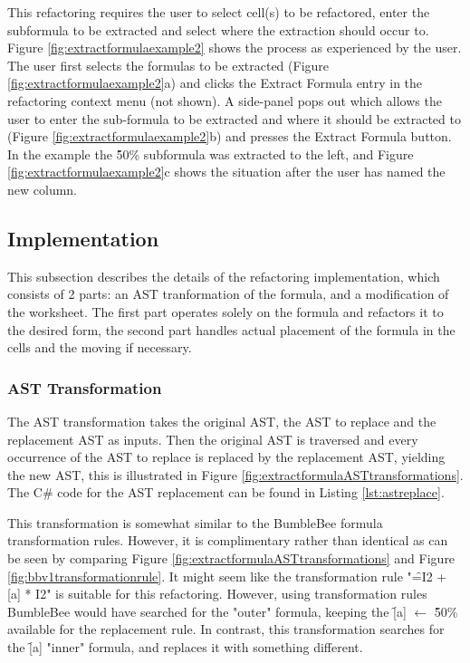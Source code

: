 This refactoring requires the user to select cell(s) to be refactored, enter the subformula to be extracted and select where the extraction should occur to.
Figure \ref{fig:extractformulaexample2} shows the process as experienced by the user.
The user first selects the formulas to be extracted (Figure \ref{fig:extractformulaexample2}a) and clicks the Extract Formula entry in the refactoring context menu (not shown).
A side-panel pops out which allows the user to enter the sub-formula to be extracted and where it should be extracted to (Figure \ref{fig:extractformulaexample2}b) and presses the Extract Formula button.
In the example the \f{50\%} subformula was extracted to the left, and Figure \ref{fig:extractformulaexample2}c shows the situation after the user has named the new column.

\subsection{Implementation}

This subsection describes the details of the refactoring implementation, which consists of 2 parts: an AST tranformation of the formula, and a modification of the worksheet.
The first part operates solely on the formula and refactors it to the desired form, the second part handles actual placement of the formula in the cells and the moving if necessary.

\subsubsection{AST Transformation}
\label{subsec:astreplacementtransformation}

The AST transformation takes the original AST, the AST to replace and the replacement AST as inputs.
Then the original AST is traversed and every occurrence of the AST to replace is replaced by the replacement AST, yielding the new AST, this is illustrated in Figure \ref{fig:extractformulaASTtransformations}.
The C\# code for the AST replacement can be found in Listing \ref{lst:astreplace}.

This transformation is somewhat similar to the BumbleBee formula transformation rules.
However, it is complimentary rather than identical as can be seen by comparing Figure \ref{fig:extractformulaASTtransformations} and Figure \ref{fig:bbv1transformationrule}.
It might seem like the transformation rule "\f{=I2 + [a] * I2}" is suitable for this refactoring.
However, using transformation rules BumbleBee would have searched for the "outer" formula, keeping the \f{[a]} $\gets$ \f{50\%} available for the replacement rule.
In contrast, this transformation searches for the \f{[a]} "inner" formula, and replaces it with something different.

